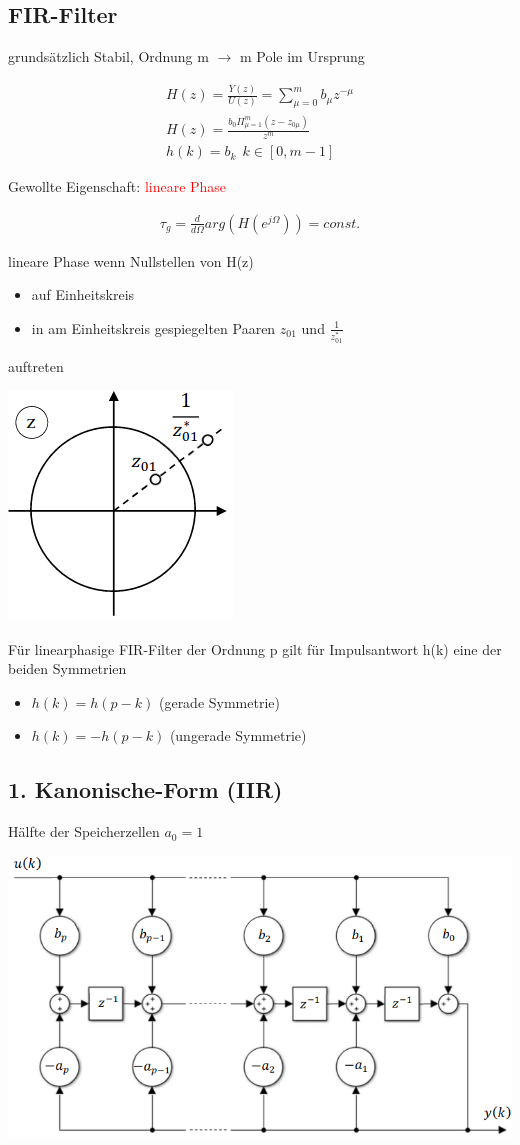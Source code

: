 \documentclass[10pt,a4paper]{article}
\begin{document}
\subsection{FIR-Filter}
grundsätzlich Stabil, Ordnung m $\rightarrow$ m Pole im Ursprung
  \begin{mdframed}[style=exercise]
    \begin{align}
        H(z)=\frac{Y(z)}{U(z)}= \sum_{\mu=0}^{m} b_\mu z^{-\mu} \\
        H(z)=\frac{b_0\Pi_{\mu=1}^{m}(z-z_{0\mu})}{z^m}\\
        h(k)= b_k \ \ k\in[0,m-1] 
    \end{align}
  \end{mdframed}
Gewollte Eigenschaft: \textcolor{red}{lineare Phase}
  \begin{mdframed}[style=exercise]
    \begin{align}
        \tau_g = \frac{d}{d\Omega} arg(H(e^{j\Omega})) = const.
    \end{align}
  \end{mdframed}
lineare Phase wenn Nullstellen von H(z)
\begin{itemize}
    \item auf Einheitskreis
    \item in am Einheitskreis gespiegelten Paaren $z_{01}$ und $\frac{1}{z^*_{01}}$
\end{itemize}
auftreten
  \begin{center}
      \includegraphics[width=.1\textwidth]{./img/fir.png}
  \end{center}
Für linearphasige FIR-Filter der Ordnung p gilt für Impulsantwort h(k) eine der beiden Symmetrien
\begin{itemize}
    \item $h(k)= h(p-k)$ (gerade Symmetrie) 
    \item $h(k)= -h(p-k)$ (ungerade Symmetrie) 
\end{itemize}

\subsection{1. Kanonische-Form (IIR)}
Hälfte der Speicherzellen $a_0=1$
  \begin{center}
      \includegraphics[width=.35\textwidth]{./img/kanon1.png}
  \end{center}
\end{document}
